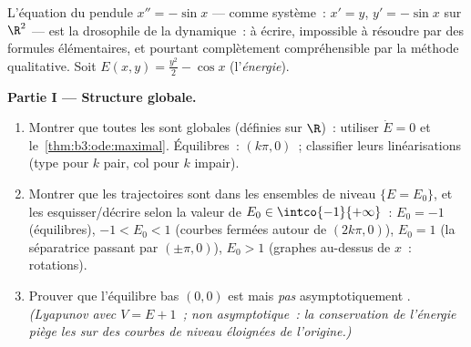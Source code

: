 \begin{problem}\label{pb:b3:ode:1}
L'équation du pendule $x'' = -\sin x$ --- comme système~:
$x' = y$, $y' = -\sin x$ sur $\R^2$ --- est la drosophile de
la dynamique~:  à écrire, impossible à résoudre par des
formules élémentaires, et pourtant complètement compréhensible
par la méthode qualitative. Soit $E(x, y) = \frac{y^2}2 -
\cos x$ (l'\emph{énergie}).

\medskip
\noindent\textbf{Partie I --- Structure globale.}
\begin{enumerate}
  \item Montrer que toutes les  sont
        globales (définies sur $\R$)~: utiliser $\dot E = 0$
        et le~\cref{thm:b3:ode:maximal}. Équilibres~:
        $(k\pi, 0)$~; classifier leurs linéarisations (type
         pour $k$ pair, col pour $k$ impair).
  \item Montrer que les trajectoires sont  dans les
        ensembles de niveau $\{E = E_0\}$, et les
        esquisser/décrire selon la valeur de $E_0 \in
        \intco{-1}{+\infty}$~: $E_0 = -1$ (équilibres), $-1 <
        E_0 < 1$ (courbes fermées autour de $(2k\pi, 0)$),
        $E_0 = 1$ (la séparatrice passant par $(\pm\pi,
        0)$), $E_0 > 1$ (graphes au-dessus de $x$~:
        rotations).
  \item Prouver que l'équilibre bas $(0,0)$ est  mais
        \emph{pas} asymptotiquement . \emph{(Lyapunov
        avec $V = E + 1$~; non asymptotique~: la conservation
        de l'énergie piège les  sur des courbes de
        niveau éloignées de l'origine.)}
\end{enumerate}


\end{problem}
